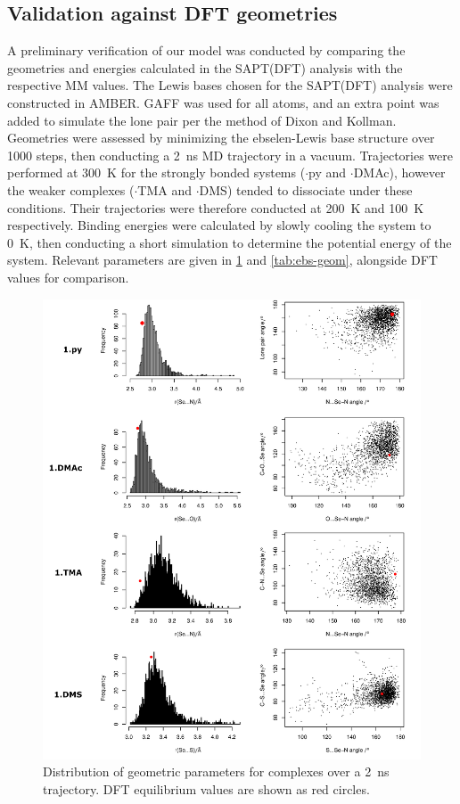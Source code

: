\begin{refsection}
\subsection{Validation against DFT geometries}
A preliminary verification of our model was conducted by comparing the geometries and energies calculated in the SAPT(DFT) analysis with the respective MM values.
The Lewis bases chosen for the SAPT(DFT) analysis were constructed in AMBER.
GAFF was used for all atoms, and an extra point was added to simulate the lone pair per the method of Dixon and Kollman.\autocite{Dixon1997}
Geometries were assessed by minimizing the ebselen-Lewis base structure over 1000 steps, then conducting a 2~ns MD trajectory in a vacuum.
Trajectories were performed at 300~K for the strongly bonded systems ($\cdot$py and $\cdot$DMAc), however the weaker complexes ($\cdot$TMA and $\cdot$DMS) tended to dissociate under these conditions.
Their trajectories were therefore conducted at 200~K and 100~K respectively.
Binding energies were calculated by slowly cooling the system to 0~K, then conducting a short simulation to determine the potential energy of the system.
Relevant parameters are given in \cref{fig:1.py-geom} and \cref{tab:ebs-geom}, alongside DFT values for comparison.

\begin{figure}
    \centering
    \includegraphics[width=\linewidth]{Figures/geom-distribution.pdf}
    \caption{Distribution of geometric parameters for complexes over a 2~ns trajectory. DFT equilibrium values are shown as red circles.}
    \label{fig:1.py-geom}
\end{figure}


\end{refsection}
